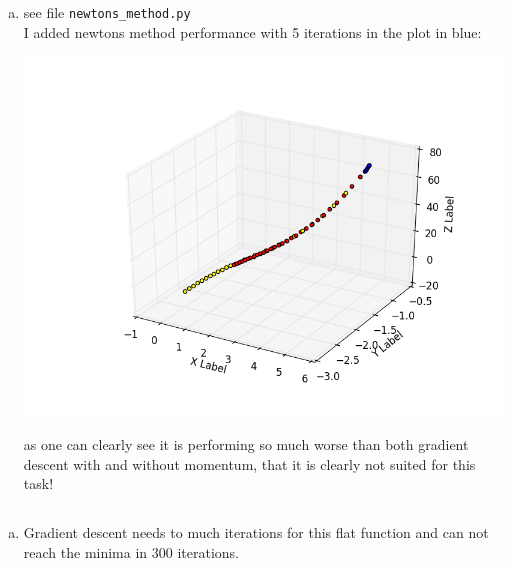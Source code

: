 \documentclass[12pt]{article}
\begin{document}
\begin{enumerate}[a)]
    \item
        see file \verb!newtons_method.py!\\
        I added newtons method performance with 5 iterations in the plot in blue:\\
        \begin{center}
            \includegraphics[scale = 0.8]{pictures/figure_2}\\
        \end{center}

        as one can clearly see it is performing so much worse than both gradient descent with and without momentum, that it is clearly not suited for this task!


\end{enumerate}


\subsection{ }

\begin{enumerate}[a)]
    \item 
        Gradient descent needs to much iterations for this flat function and can not reach the minima in 300 iterations.

\end{enumerate}
\end{document}
